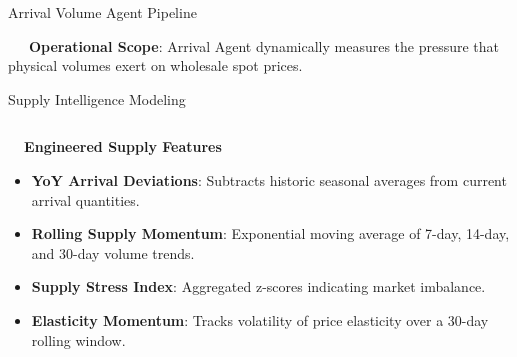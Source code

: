 \documentclass{beamer}
\begin{document}
\begin{frame}{Arrival Volume Agent Pipeline}
\vspace{0.15cm}
\begin{tcolorbox}[enhanced, colback=primaryblue!4, colframe=primaryblue!30, boxrule=0.35pt,
  arc=3.5pt, width=0.98\textwidth, left=4pt, right=4pt, top=2.5pt, bottom=2.5pt, boxsep=0pt,
  halign=center, shadow={0.5pt}{-0.5pt}{0pt}{black!8}]
    \fontsize{5.5pt}{6.5pt}\selectfont
    \textcolor{primaryDark}{~~~\textbf{Operational Scope}: Arrival Agent dynamically measures the pressure that physical volumes exert on wholesale spot prices.}
\end{tcolorbox}
\end{frame}

\begin{frame}{Supply Intelligence Modeling}
\vspace{-0.2cm}

\begin{columns}[T]
    \begin{column}{0.48\textwidth}
        \begin{smallcard}[0.98\textwidth, top=3pt, bottom=3pt, left=4pt, right=4pt, boxsep=0.5pt]
            \centering \textbf{\textcolor{primaryDark}{\small {}~~Engineered Supply Features}}
            \vspace{0.08cm}
            \fontsize{6.8pt}{8.2pt}\selectfont
            \begin{itemize}\setlength\itemsep{4pt}\setlength\parskip{0pt}
                \item \textbf{YoY Arrival Deviations}: Subtracts historic seasonal averages from current arrival quantities.
                \item \textbf{Rolling Supply Momentum}: Exponential moving average of 7-day, 14-day, and 30-day volume trends.
                \item \textbf{Supply Stress Index}: Aggregated z-scores indicating market imbalance.
                \item \textbf{Elasticity Momentum}: Tracks volatility of price elasticity over a 30-day rolling window.
            \end{itemize}
        \end{smallcard}
    \end{column}
    

\end{columns}
\end{frame}
\end{document}
